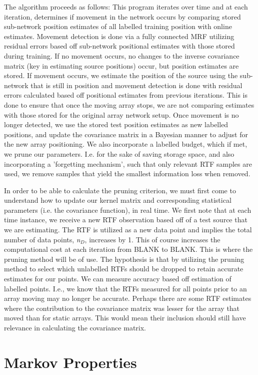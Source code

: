 \documentclass{article}
\begin{document}
The algorithm proceeds as follows: This program iterates over time and at each iteration, determines if movement in the network occurs by comparing stored sub-network position estimates of all labelled training position with online estimates. Movement detection is done via a fully connected MRF utilizing residual errors based off sub-network positional estimates with those stored during training. If no movement occurs, no changes to the inverse covariance matrix (key in estimating source positions) occur, but position estimates are stored. If movement occurs, we estimate the position of the source using the sub-network that is still in position and movement detection is done with residual errors calculated based off positional estimates from previous iterations. This is done to ensure that once the moving array stops, we are not comparing estimates with those stored for the original array network setup. Once movement is no longer detected, we use the stored test position estimates as new labelled positions, and update the covariance matrix in a Bayesian manner to adjust for the new array positioning. We also incorporate a labelled budget, which if met, we prune our parameters. 
I.e. for the sake of saving storage space, and also incorporating a 'forgetting mechanism', such that only relevant RTF samples are used, we remove samples that yield the smallest information loss when removed.

In order to be able to calculate the pruning criterion, we must first come to understand how to update our kernel matrix and corresponding statistical parameters (i.e. the covariance function), in real time. We first note that at each time instance, we receive a new RTF observation based off of a test source that we are estimating. The RTF is utilized as a new data point and implies the total number of data points, \textit{n$_D$}, increases by 1. This of course increases the computational cost at each iteration from BLANK to BLANK. This is where the pruning method will be of use. The hypothesis is that by utilizing the pruning method to select which unlabelled RTFs should be dropped to retain accurate estimates for our points. We can measure accuracy based off estimation of labelled points. I.e., we know that the RTFs measured for all points prior to an array moving may no longer be accurate. Perhaps there are some RTF estimates where the contribution to the covariance matrix was lesser for the array that moved than for static arrays. This would mean their inclusion should still have relevance in calculating the covariance matrix.


\appendix
\section{Markov Properties}



\end{document}
